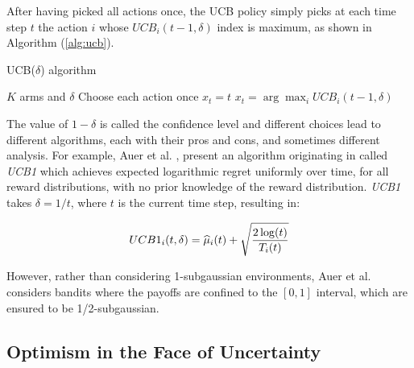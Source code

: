 After having picked all actions once, the \gls{UCB} policy simply picks at each time step $t$ the action $i$ whose $UCB_i(t-1,\delta)$ index is maximum, as shown in Algorithm (\ref{alg:ucb}).

\begin{algorithm}[t]
	\caption{UCB($\delta$) algorithm}
	\label{alg:ucb}
	\begin{algorithmic}[1]
	 $K$ arms and $\delta$
	\State Choose each action once
			\State $x_{t} = t$
		\Else
			\State $x_t = \arg\max_i UCB_i(t-1, \delta)$
		\EndIf
	\EndFor
	\end{algorithmic}
\end{algorithm}


The value of $1-\delta$ is called the confidence level and different choices lead to different algorithms, each with their pros and cons, and sometimes different analysis. For example, Auer et al. \cite{auer2002finite}, present an algorithm originating in \cite{agrawal1995continuum} called \emph{UCB1} which achieves expected logarithmic regret uniformly over time, for all reward distributions, with no prior knowledge of the reward distribution. \emph{UCB1} takes $\delta=1/t$, where $t$ is the current time step, resulting in:

\begin{align}
UCB1_i(t, \delta) = \widehat{\mu}_i(t) + \sqrt{\frac{2\log(t)}{T_i(t)}}
\end{align}

However, rather than considering 1-subgaussian environments, Auer et al. \cite{auer2002finite} considers bandits where the payoffs are confined to the $[0,1]$ interval, which are ensured to be 1/2-subgaussian.

\subsection{Optimism in the Face of Uncertainty}


